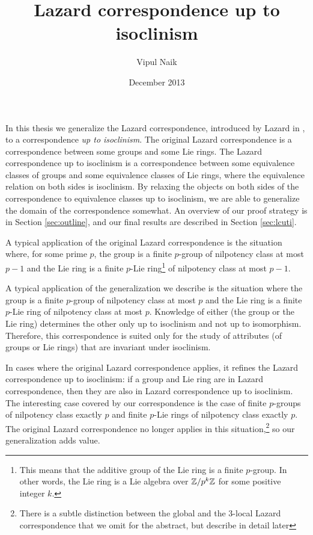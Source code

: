 \documentclass{ucetd}
\title{Lazard correspondence up to isoclinism}
\author{Vipul Naik}
\date{December 2013}
\begin{document}
\maketitle



\tableofcontents
\listoftables

\abstract

In this thesis we generalize the Lazard correspondence, introduced by
Lazard in \cite{Lazardsoriginal}, to a correspondence {\em up to
  isoclinism}. The original Lazard correspondence is a correspondence
between some groups and some Lie rings. The Lazard correspondence up
to isoclinism is a correspondence between some equivalence classes of
groups and some equivalence classes of Lie rings, where the
equivalence relation on both sides is isoclinism. By relaxing the
objects on both sides of the correspondence to equivalence classes up
to isoclinism, we are able to generalize the domain of the
correspondence somewhat. An overview of our proof strategy is in
Section \ref{sec:outline}, and our final results are described in
Section \ref{sec:lcuti}.

A typical application of the original Lazard correspondence is the
situation where, for some prime $p$, the group is a finite $p$-group
of nilpotency class at most $p - 1$ and the Lie ring is a finite
$p$-Lie ring\footnote{This means that the additive group of the Lie
  ring is a finite $p$-group. In other words, the Lie ring is a Lie
  algebra over $\mathbb{Z}/p^k\mathbb{Z}$ for some positive integer $k$.} of
nilpotency class at most $p - 1$.

A typical application of the generalization we describe is the
situation where the group is a finite $p$-group of nilpotency class at
most $p$ and the Lie ring is a finite $p$-Lie ring of nilpotency class
at most $p$. Knowledge of either (the group or the Lie ring)
determines the other only up to isoclinism and not up to
isomorphism. Therefore, this correspondence is suited only for the
study of attributes (of groups or Lie rings) that are invariant under
isoclinism.

In cases where the original Lazard correspondence applies, it refines
the Lazard correspondence up to isoclinism: if a group and Lie ring
are in Lazard correspondence, then they are also in Lazard
correspondence up to isoclinism. The interesting case covered by our
correspondence is the case of finite $p$-groups of nilpotency class
exactly $p$ and finite $p$-Lie rings of nilpotency class exactly
$p$. The original Lazard correspondence no longer applies in this
situation,\footnote{There is a subtle distinction between the global
  and the $3$-local Lazard correspondence that we omit for the
  abstract, but describe in detail later} so our generalization
adds value.
\end{document}
